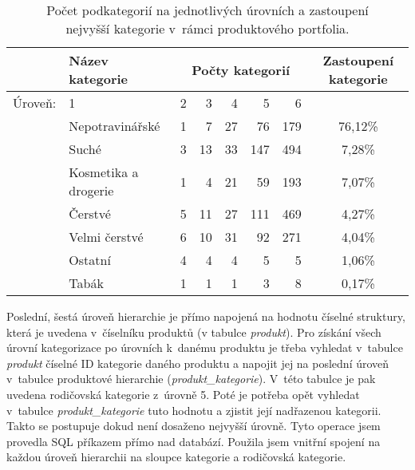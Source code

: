 \begin{table}[hbtp!]
    \captionsetup{justification=centering}
    \begin{center}
    \caption{Počet podkategorií na jednotlivých úrovních a zastoupení \\ nejvyšší kategorie v~rámci produktového portfolia.}
    \label{tab:d:4Bzast}
    \begin{tabular}{rp{4cm}  r r r r r  c}
        & Název kategorie & \multicolumn{5}{c}{Počty kategorií} &      Zastoupení kategorie      \\
        \midrule

        Úroveň: & 1       & 2    & 3   & 4   & 5    & 6    &  \\

        \midrule
        & Nepotravinářské    & 1     & 7    & 27   & 76    & 179   & 76,12\%              \\
        & Suché         & 3     & 13   & 33   & 147   & 494   & 7,28\%               \\
        & Kosmetika a drogerie        & 1     & 4    & 21   & 59    & 193   & 7,07\%               \\
        & Čerstvé       & 5     & 11   & 27   & 111   & 469   & 4,27\%               \\
        & Velmi čerstvé & 6     & 10   & 31   & 92    & 271   & 4,04\%               \\
        & Ostatní     & 4     & 4    & 4    & 5     & 5     & 1,06\%               \\
        & Tabák    & 1     & 1    & 1    & 3     & 8     & 0,17\%   \\
    \end{tabular}
    \end{center}
    \end{table}

Poslední, šestá úroveň hierarchie je přímo napojená na hodnotu číselné struktury, která je uvedena v~číselníku produktů (v tabulce \emph{produkt}). Pro získání všech úrovní kategorizace po úrovních k~danému produktu je třeba vyhledat v~tabulce \emph{produkt} číselné ID kategorie daného produktu a napojit jej na poslední úroveň v~tabulce produktové hierarchie (\emph{produkt\_kategorie}). V~této tabulce je pak uvedena rodičovská kategorie z~úrovně 5. Poté je potřeba opět vyhledat v~tabulce \emph{produkt\_kategorie} tuto hodnotu a zjistit její nadřazenou kategorii. Takto se postupuje dokud není dosaženo nejvyšší úrovně. Tyto operace jsem provedla SQL příkazem přímo nad databází. Použila jsem vnitřní spojení na každou úroveň hierarchii na sloupce kategorie a rodičovská kategorie.

